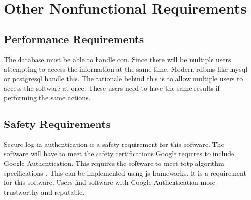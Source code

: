 \documentclass{article}
\newcommand{\comment}[1]{}
\begin{document}
\section{Other Nonfunctional Requirements}
\subsection{Performance Requirements}
\comment{
If there are performance requirements for the product under various circumstances, stat them here and explain their rationale, to help developers understand the intent and make suitable design choices. Specift the timing relationships for real time systems. Make such requirements as specific as possible. You may need to state performance requirements for individual functional requirements or features.
}
The \gls{database} must be able to handle \gls{con}. Since there will be multiple users attempting to access the information at the same time. Modern \acrshort{rdbms} like \gls{mysql} or \gls{postgresql} handle this. The rationale behind this is to allow multiple users to access the software at once. These users need to have the same results if performing the same actions.
\subsection{Safety Requirements}
\comment{
Specify those requirements that are concerned with possible loss, damage, or harm that could result from use of the product. Define any safeguards or actions that must be taken, as well as actions that must be prevented. Refer to any external policies or regulations that state safety issues that affect the product's design or use. Define any safety certifications that must be satisfied.
	}
Secure log in authentication is a safety requirement for this software. The software will have to meet the safety certifications Google requires to include Google Authentication. This requires the software to meet \gls{totp} algorithm specifications \parencite{totp11}. This can be implemented using \acrfull{js} frameworks. It is a requirement for this software. Users find software with Google Authentication more trustworthy and reputable.
\end{document}

